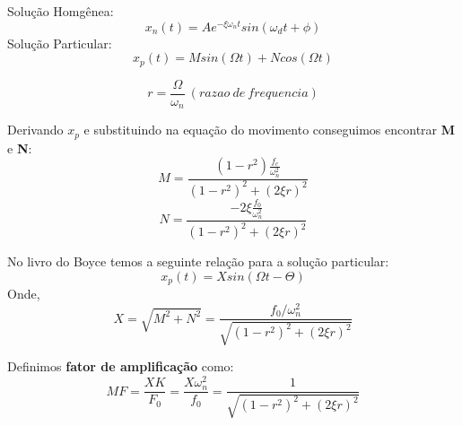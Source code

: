 \documentclass[a4paper, 12pt]{article}
\begin{document}
	Solução Homgênea:
	\begin{equation}
	x_n(t) = A e^{-\xi \omega_n t} sin(\omega_d t + \phi)
	\end{equation}
	Solução Particular:
	\begin{equation}
	x_p(t) = M sin(\Omega t) + N cos(\Omega t)
	\end{equation}
	
	\begin{equation}
	\boxed{r = \frac{\Omega}{\omega_n}  \ (razao \ de\ frequencia)}
	\end{equation}
	
	Derivando $x_p$ e substituindo na equação do movimento conseguimos encontrar \textbf{M} e \textbf{N}:
	\begin{equation}
	\boxed{M = \frac{(1 - r^2)\frac{f_c}{\omega_n^2}}{(1-r^2)^2 + (2\xi r)^2}}
	\end{equation}
	\begin{equation}
	\boxed{N = \frac{-2 \xi \frac{f_0}{\omega_n^2}}{(1-r^2)^2 + (2\xi r)^2}}
	\end{equation}
	
	No livro do Boyce temos a seguinte relação para a solução particular:
	\begin{equation}
	x_p(t) = X sin(\Omega t - \Theta)
	\end{equation}
	Onde,
	\begin{equation}
	X = \sqrt{M^2 + N^2} = \frac{f_0/\omega_n^2}{\sqrt{(1-r^2)^2 + (2 \xi r)^2}}
	\end{equation}
	
	Definimos \textbf{fator de amplificação} como:
	\begin{equation}
	MF =  \frac{XK}{F_0} = \frac{X \omega_n^2}{f_0} = \frac{1}{\sqrt{(1-r^2)^2 + (2\xi r)^2}}
	\end{equation}
	
\end{document}
